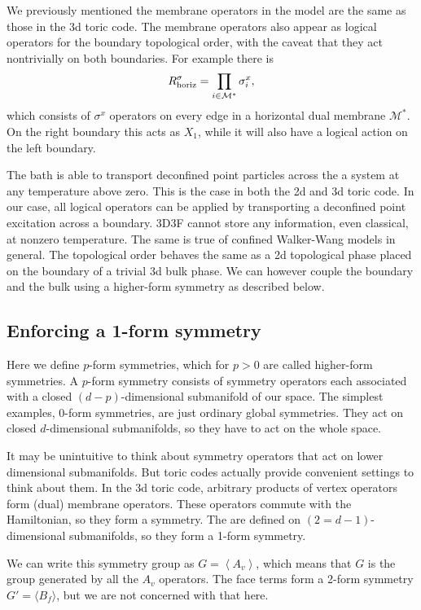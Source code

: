 We previously mentioned the membrane operators in the model are the same as those in the 3d toric code. The membrane operators also appear as logical operators for the boundary topological order, with the caveat that they act nontrivially on both boundaries. For example there is 
\begin{align}
R^\sigma_{\text{horiz}} = \prod_{i\in \mathcal{M}^*} \sigma^x_i,
\end{align}
which consists of $\sigma^x$ operators on every edge in a horizontal dual membrane $\mathcal{M}^*$. On the right boundary this acts as $X_1$, while it will also have a logical action on the left boundary.

The bath is able to transport deconfined point particles across the a system at any temperature above zero. This is the case in both the 2d and 3d toric code. In our case, all logical operators can be applied by transporting a deconfined point excitation across a boundary. 3D3F cannot store any information, even classical, at nonzero temperature. The same is true of confined Walker-Wang models in general. The topological order behaves the same as a 2d topological phase placed on the boundary of a trivial 3d bulk phase. We can however couple the boundary and the bulk using a higher-form symmetry as described below.

\subsection{Enforcing a 1-form symmetry} \label{sub:1form}

Here we define $p$-form symmetries, which for $p>0$ are called higher-form symmetries. A $p$-form symmetry consists of symmetry operators each associated with a closed $(d-p)$-dimensional submanifold of our space. The simplest examples, 0-form symmetries, are just ordinary global symmetries. They act on closed $d$-dimensional submanifolds, so they have to act on the whole space.
	
It may be unintuitive to think about symmetry operators that act on lower dimensional submanifolds. But toric codes actually provide convenient settings to think about them. In the 3d toric code, arbitrary products of vertex operators form (dual) membrane operators. These operators commute with the Hamiltonian, so they form a symmetry. The are defined on $(2=d-1)$-dimensional submanifolds, so they form a 1-form symmetry. 

We can write this symmetry group as $G=\left\langle A_v\right \rangle$, which means that $G$ is the group generated by all the $A_v$ operators.
The face terms form a 2-form symmetry $G'=\langle B_f\rangle$, but we are not concerned with that here.


